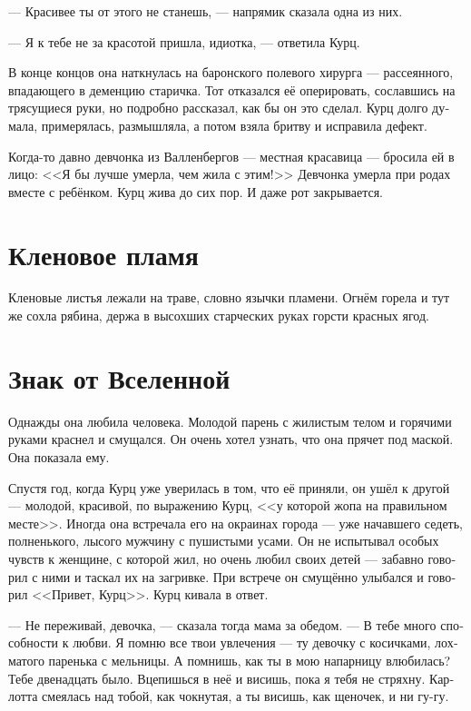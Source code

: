 \documentclass[a4paper,10pt,fleqn]{book}\usepackage{polyglossia}\setdefaultlanguage[babelshorthands=true]{russian}\setotherlanguage{english}\defaultfontfeatures{Ligatures=TeX,Mapping=tex-text}\usepackage{xcolor}\newcommand{\ml}[3]{#2}
\begin{document}
--- Красивее ты от этого не станешь, --- напрямик сказала одна из них.

--- Я к тебе не за красотой пришла, идиотка, --- ответила Курц.

В конце концов она наткнулась на баронского полевого хирурга --- рассеянного, впадающего в деменцию старичка.
Тот отказался её оперировать, сославшись на трясущиеся руки, но подробно рассказал, как бы он это сделал.
Курц долго думала, примерялась, размышляла, а потом взяла бритву и исправила дефект.

Когда-то давно девчонка из Валленбергов --- местная красавица --- бросила ей в лицо:
<<Я бы лучше умерла, чем жила с этим!>>
Девчонка умерла при родах вместе с ребёнком.
Курц жива до сих пор.
И даже рот закрывается.

\section{Кленовое пламя}

Кленовые листья лежали на траве, словно язычки пламени.
Огнём горела и тут же сохла рябина, держа в высохших старческих руках горсти красных ягод.

\section{Знак от Вселенной}

Однажды она любила человека.
Молодой парень с жилистым телом и горячими руками краснел и смущался.
Он очень хотел узнать, что она прячет под маской.
Она показала ему.

Спустя год, когда Курц уже уверилась в том, что её приняли, он ушёл к другой --- молодой, красивой, по выражению Курц, <<у которой жопа на правильном месте>>.
Иногда она встречала его на окраинах города --- уже начавшего седеть, полненького, лысого мужчину с пушистыми усами.
Он не испытывал особых чувств к женщине, с которой жил, но очень любил своих детей --- забавно говорил с ними и таскал их на загривке.
При встрече он смущённо улыбался и говорил <<Привет, Курц>>.
Курц кивала в ответ.

--- Не переживай, девочка, --- сказала тогда мама за обедом.
--- В тебе много способности к любви.
Я помню все твои увлечения --- ту девочку с косичками, лохматого паренька с мельницы.
А помнишь, как ты в мою напарницу влюбилась?
Тебе двенадцать было.
Вцепишься в неё и висишь, пока я тебя не стряхну.
Карлотта смеялась над тобой, как чокнутая, а ты висишь, как щеночек, и ни гу-гу.
\end{document}
